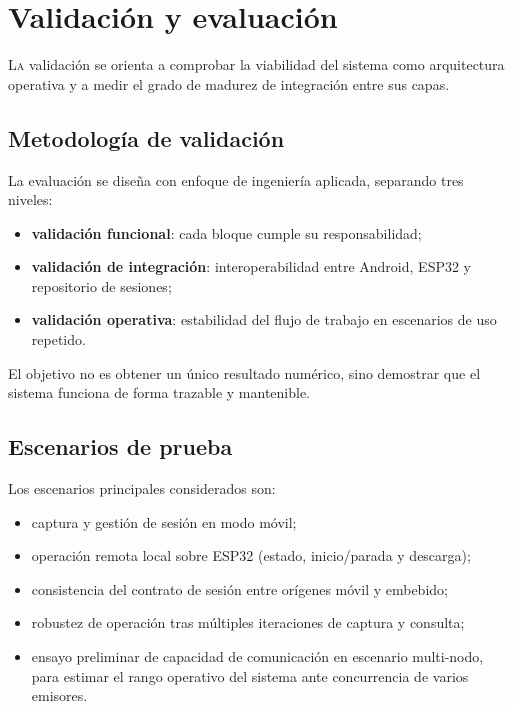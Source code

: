 \chapter{Validación y evaluación}
\label{chap:validacion}

\lettrine{L}{a} validación se orienta a comprobar la viabilidad del sistema como arquitectura operativa y a medir el grado de madurez de integración entre sus capas.

\section{Metodología de validación}

La evaluación se diseña con enfoque de ingeniería aplicada, separando tres niveles:

\begin{itemize}
  \item \textbf{validación funcional}: cada bloque cumple su responsabilidad;
  \item \textbf{validación de integración}: interoperabilidad entre Android, ESP32 y repositorio de sesiones;
  \item \textbf{validación operativa}: estabilidad del flujo de trabajo en escenarios de uso repetido.
\end{itemize}

El objetivo no es obtener un único resultado numérico, sino demostrar que el sistema funciona de forma trazable y mantenible.

\section{Escenarios de prueba}

Los escenarios principales considerados son:

\begin{itemize}
  \item captura y gestión de sesión en modo móvil;
  \item operación remota local sobre ESP32 (estado, inicio/parada y descarga);
  \item consistencia del contrato de sesión entre orígenes móvil y embebido;
  \item robustez de operación tras múltiples iteraciones de captura y consulta;
  \item ensayo preliminar de capacidad de comunicación en escenario multi-nodo, para estimar el rango operativo del sistema ante concurrencia de varios emisores.
\end{itemize}

